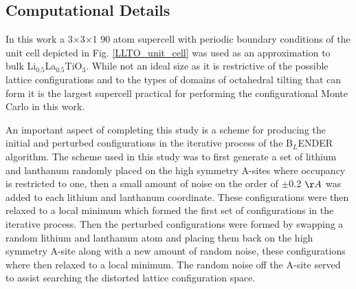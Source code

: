 \documentclass[aps,pre,reprint,superscriptaddress,showkeys]{revtex4-1}
\begin{document}
\subsection{Computational Details}
In this work a 3$\times$3$\times$1 90 atom supercell with periodic boundary conditions of the unit cell depicted in Fig. \ref{LLTO_unit_cell} was used as an approximation to bulk Li$_{0.5}$La$_{0.5}$TiO$_{3}$. While not an ideal size as it is  restrictive of the possible lattice configurations and to the types of domains of octahedral tilting that can form it is the largest supercell practical for performing the configurational Monte Carlo in this work. 

An important aspect of completing this study is a scheme for producing the initial and perturbed configurations in the iterative process of the B$_L$ENDER algorithm. The scheme used in this study was to first generate a set of lithium and lanthanum randomly placed on the high symmetry A-sites where occupancy is restricted to one, then a small amount of noise on the order of $\pm$0.2 $\AA$ was added to each lithium and lanthanum coordinate. These configurations were then relaxed to a local minimum which formed the first set of configurations in the iterative process.  Then the perturbed configurations  were formed by swapping a random lithium and lanthanum atom and placing them back on the high symmetry A-site along with a new amount of random noise, these configurations where then relaxed to a local minimum. The random noise off the A-site served to assist searching the distorted lattice configuration space. 
\end{document}
